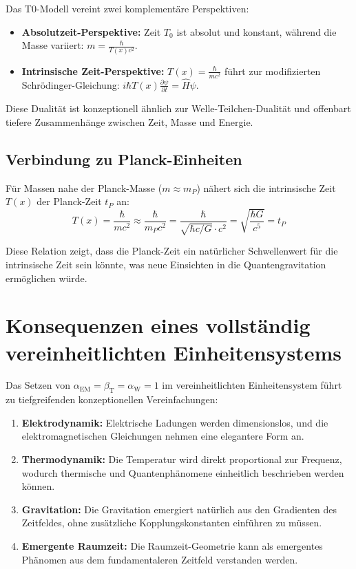 \documentclass[12pt,a4paper]{article}
\newcommand{\Tfield}{T(x)}
\newcommand{\betaT}{\beta_{\text{T}}}
\newcommand{\alphaEM}{\alpha_{\text{EM}}}
\newcommand{\alphaW}{\alpha_{\text{W}}}
\newcommand{\Tzero}{T_0}
\begin{document}
	Das T0-Modell vereint zwei komplementäre Perspektiven:
	\begin{itemize}
		\item \textbf{Absolutzeit-Perspektive:} Zeit \(\Tzero\) ist absolut und konstant, während die Masse variiert: \(m = \frac{\hbar}{\Tfield c^2}\).
		\item \textbf{Intrinsische Zeit-Perspektive:} \(\Tfield = \frac{\hbar}{m c^2}\) führt zur modifizierten Schrödinger-Gleichung: \(i\hbar \Tfield \frac{\partial \psi}{\partial t} = \hat{H} \psi\).
	\end{itemize}
	
	Diese Dualität ist konzeptionell ähnlich zur Welle-Teilchen-Dualität und offenbart tiefere Zusammenhänge zwischen Zeit, Masse und Energie.
	
	\subsection{Verbindung zu Planck-Einheiten}
	
	Für Massen nahe der Planck-Masse (\(m \approx m_P\)) nähert sich die intrinsische Zeit \(\Tfield\) der Planck-Zeit \(t_P\) an:
	\begin{equation}
		\Tfield = \frac{\hbar}{m c^2} \approx \frac{\hbar}{m_P c^2} = \frac{\hbar}{\sqrt{\hbar c/G} \cdot c^2} = \sqrt{\frac{\hbar G}{c^5}} = t_P
	\end{equation}
	
	Diese Relation zeigt, dass die Planck-Zeit ein natürlicher Schwellenwert für die intrinsische Zeit sein könnte, was neue Einsichten in die Quantengravitation ermöglichen würde.
	
	\section{Konsequenzen eines vollständig vereinheitlichten Einheitensystems}
	
	Das Setzen von \(\alphaEM = \betaT = \alphaW = 1\) im vereinheitlichten Einheitensystem führt zu tiefgreifenden konzeptionellen Vereinfachungen:
	
	\begin{enumerate}
		\item \textbf{Elektrodynamik:} Elektrische Ladungen werden dimensionslos, und die elektromagnetischen Gleichungen nehmen eine elegantere Form an.
		\item \textbf{Thermodynamik:} Die Temperatur wird direkt proportional zur Frequenz, wodurch thermische und Quantenphänomene einheitlich beschrieben werden können.
		\item \textbf{Gravitation:} Die Gravitation emergiert natürlich aus den Gradienten des Zeitfeldes, ohne zusätzliche Kopplungskonstanten einführen zu müssen.
		\item \textbf{Emergente Raumzeit:} Die Raumzeit-Geometrie kann als emergentes Phänomen aus dem fundamentaleren Zeitfeld verstanden werden.
	\end{enumerate}
	
\end{document}
